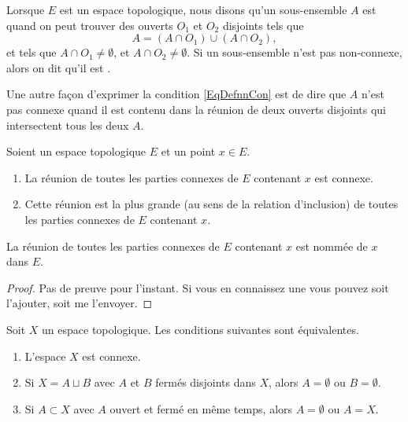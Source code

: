 \begin{definition}  \label{DefIRKNooJJlmiD}
     Lorsque $E$ est un espace topologique, nous disons qu'un sous-ensemble $A$ est  quand on peut trouver des ouverts $O_1$ et $O_2$ disjoints tels que
    \begin{equation}    \label{EqDefnnCon}
        A=(A\cap O_1)\cup (A\cap O_2),
    \end{equation}
    et tels que $A\cap O_1\neq\emptyset$, et $A\cap O_2\neq\emptyset$. Si un sous-ensemble n'est pas non-connexe, alors on dit qu'il est .
\end{definition}
Une autre façon d'exprimer la condition \eqref{EqDefnnCon} est de dire que $A$ n'est pas connexe quand il est contenu dans la réunion de deux ouverts disjoints qui intersectent tous les deux $A$.

\begin{propositionDef}        \label{DEFooFHXNooJGUPPn}
    Soient un espace topologique \( E\) et un point \( x\in E\).
    \begin{enumerate}
        \item
            La réunion de toutes les parties connexes de \( E\) contenant $x$ est connexe. 
        \item
            Cette réunion est la plus grande (au sens de la relation d'inclusion) de toutes les parties connexes de \( E\) contenant $x$.
    \end{enumerate}
    La réunion de toutes les parties connexes de \( E\) contenant $x$ est nommée  de \( x\) dans \( E\).
\end{propositionDef}

\begin{proof}
    Pas de preuve pour l'instant. Si vous en connaissez une vous pouvez soit l'ajouter, soit me l'envoyer.
\end{proof}

\begin{proposition} \label{PropHSjJcIr}
    Soit \( X\) un espace topologique. Les conditions suivantes sont équivalentes.
    \begin{enumerate}
        \item
            L'espace \( X\) est connexe.
        \item
            Si \( X=A\sqcup B\) avec \( A\) et \( B\) fermés disjoints dans \( X\), alors \( A=\emptyset\) ou \( B=\emptyset\).
        \item       \label{ITEMooNIPZooIDPmEf}
            Si \( A\subset X\) avec \( A\) ouvert et fermé en même temps, alors \( A=\emptyset\) ou \( A=X\).
    \end{enumerate}
\end{proposition}


